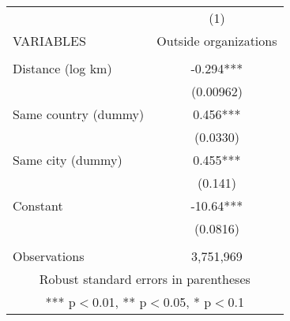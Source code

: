 \begin{tabular}{lc} \hline
 & (1) \\
VARIABLES & Outside organizations \\ \hline
 &  \\
Distance (log km) & -0.294*** \\
 & (0.00962) \\
Same country (dummy) & 0.456*** \\
 & (0.0330) \\
Same city (dummy) & 0.455*** \\
 & (0.141) \\
Constant & -10.64*** \\
 & (0.0816) \\
 &  \\
 Observations & 3,751,969 \\ \hline
\multicolumn{2}{c}{ Robust standard errors in parentheses} \\
\multicolumn{2}{c}{ *** p$<$0.01, ** p$<$0.05, * p$<$0.1} \\
\end{tabular}
